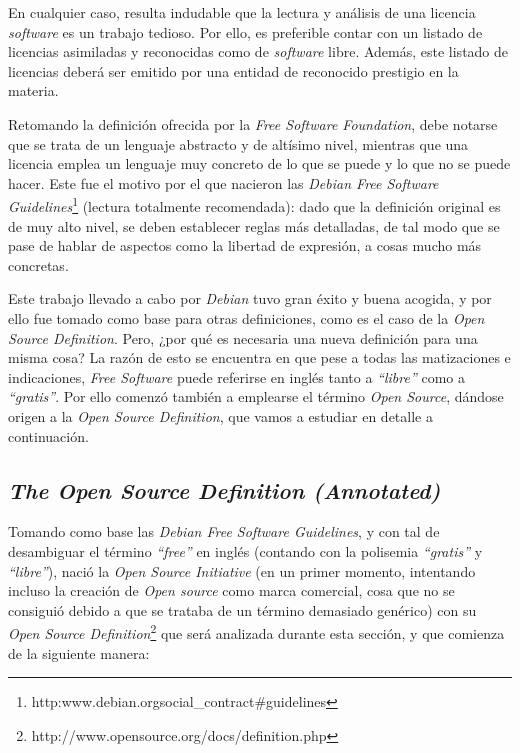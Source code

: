 En cualquier caso, resulta indudable que la lectura y análisis de una licencia
\textit{software} es un trabajo tedioso. Por ello, es preferible contar con un
listado de licencias asimiladas y reconocidas como de \textit{software} libre.
Además, este listado de licencias deberá ser emitido por una entidad de
reconocido prestigio en la materia.

Retomando la definición ofrecida por la \textit{Free Software Foundation}, debe
notarse que se trata de un lenguaje abstracto y de altísimo nivel, mientras que
una licencia emplea un lenguaje muy concreto de lo que se puede y lo que no se
puede hacer. Este fue el motivo por el que nacieron las \textit{Debian Free
Software Guidelines}\footnote{
http:\/\/www.debian.org\/social\_contract\#guidelines } (lectura totalmente
recomendada): dado que la definición original es de muy alto nivel, se deben
establecer reglas más detalladas, de tal modo que se pase de hablar de aspectos
como la libertad de expresión, a cosas mucho más concretas.

Este trabajo llevado a cabo por \textit{Debian} tuvo gran éxito y buena acogida,
y por ello fue tomado como base para otras definiciones, como es el caso de
la \textit{Open Source Definition}. Pero, ¿por qué es necesaria una nueva
definición para una misma cosa? La razón de esto se encuentra en que pese a
todas las matizaciones e indicaciones, \textit{Free Software} puede referirse en
inglés tanto a \textit{``libre''} como a \textit{``gratis''}. Por ello comenzó
también a emplearse el término \textit{Open Source}, dándose origen a la
\textit{Open Source Definition}, que vamos a estudiar en detalle a continuación.

\subsection{\textit{The Open Source Definition (Annotated)}}

Tomando como base las \textit{Debian Free Software Guidelines}, y con tal de
desambiguar el término \textit{``free''} en inglés (contando con la polisemia
\textit{``gratis''} y \textit{``libre''}), nació la \textit{Open Source
Initiative} (en un primer momento, intentando incluso la creación de
\textit{Open source} como marca comercial, cosa que no se consiguió debido a que
se trataba de un término demasiado genérico) con su \textit{Open Source
Definition}\footnote{ http://www.opensource.org/docs/definition.php } que será
analizada durante esta sección, y que comienza de la siguiente
manera:\vspace{0.4cm}


